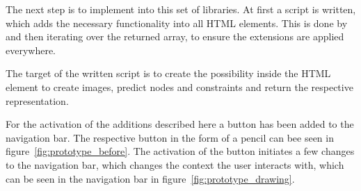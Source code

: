 The next step is to implement  into this set of libraries.
At first a script is written, which adds the necessary functionality into all  HTML elements.
This is done by  and then iterating over the returned array, to ensure the extensions are applied everywhere.

The target of the written script is to create the possibility inside the  HTML element to create images, predict nodes and constraints and return the respective  representation.

For the activation of the additions described here a button has been added to the navigation bar.
The respective button in the form of a pencil can bee seen in figure~\ref{fig:prototype_before}.
The activation of the button initiates a few changes to the navigation bar, which changes the context the user interacts with, which can be seen in the navigation bar in figure~\ref{fig:prototype_drawing}.

